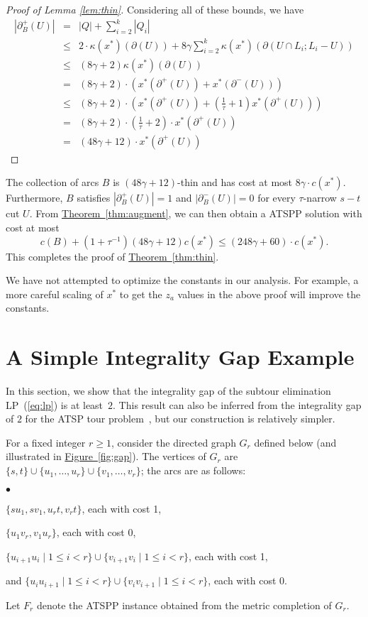 \documentclass[11pt]{article}
\newcommand{\lref}[2][]{\hyperref[#2]{#1~\ref*{#2}}}
\theoremstyle{definition}
\def\A{{B}}
\newcounter{note}[section]
\newcommand{\initOneLiners}{\setlength{\itemsep}{0pt}
    \setlength{\parsep }{0pt}
    \setlength{\topsep }{0pt}
}
\newenvironment{OneLiners}[1][\ensuremath{\bullet}]
    {\begin{list}
        {#1}
        {\initOneLiners}}
    {\end{list}}
\begin{document}
\begin{proof}[Proof of Lemma \ref{lem:thin}]
Considering all of these bounds, we have
\begin{eqnarray*}
|\partial_{\A}^{+}(U)| & = & |Q| + \sum_{i=2}^k |Q_i| \\
& \leq & 2 \cdot \kappa(x^*)(\partial(U)) + 8 \gamma \sum_{i=2}^k \kappa(x^*)(\partial(U \cap L_i;L_i-U)) \\
& \leq & (8\gamma + 2) \kappa(x^*)(\partial(U)) \\
& = & (8\gamma + 2) \cdot (x^*(\partial^+(U)) + x^*(\partial^-(U))) \\
& \leq & (8\gamma + 2) \cdot \left(x^*(\partial^+(U)) + \left(\frac{1}{\tau} + 1\right)x^*(\partial^+(U))\right) \\
& = & (8\gamma + 2) \cdot \left(\frac{1}{\tau} + 2\right) \cdot x^*(\partial^+(U)) \\
& = & (48 \gamma + 12) \cdot x^*(\partial^+(U))
\end{eqnarray*}
\end{proof}

The collection of arcs $\A$ is $(48 \gamma + 12)$-thin and has cost at most $8\gamma \cdot c(x^*)$.
Furthermore, $\A$ satisfies $|\partial_\A^+(U)| = 1$ and $|\partial_\A^-(U)| = 0$ for every  $\tau$-narrow $s-t$ cut $U$.
From \lref[Theorem]{thm:augment}, we can then obtain a ATSPP solution with cost at most
\[ c(\A) + (1 + \tau^{-1})(48\gamma + 12) c(x^*) \leq (248 \gamma + 60) \cdot c(x^*). \]
This completes the proof of \lref[Theorem]{thm:thin}.

We have not attempted to optimize the constants in our analysis. For example, a more careful scaling of $x^*$ to get the $z_a$ values
in the above proof will improve the constants.



\section{A Simple Integrality Gap Example}
\label{sec:int-gap}

In this section, we show that the integrality gap of the subtour
elimination LP~(\ref{eq:lp}) is at least~$2$. This result can also be
inferred from the integrality gap of $2$ for the ATSP tour
problem~\cite{CGK06}, but our construction is relatively simpler.

For a fixed integer $r \geq 1$, consider the directed graph $G_r$
defined below (and illustrated in \lref[Figure]{fig:gap}). The vertices of
$G_r$ are $\{s,t\} \cup \{u_1, \ldots, u_r\} \cup \{v_1, \ldots, v_r\}$;
the arcs are as follows:
\begin{OneLiners}
\item $\{ su_1, sv_1, u_rt, v_rt \}$, each with cost 1,
\item $\{ u_1v_r, v_1u_r \}$, each with cost 0,
\item $\{u_{i+1}u_i \mid 1 \leq i < r\} \cup \{v_{i+1}v_i \mid 1 \leq i < r\}$,
  each with cost 1,
\item and $\{u_iu_{i+1} \mid 1 \leq i < r\} \cup \{v_iv_{i+1} \mid 1 \leq i <
  r\}$, each with cost 0.
\end{OneLiners}
Let $F_r$ denote the ATSPP instance obtained from the metric completion
of $G_r$.
\end{document}
